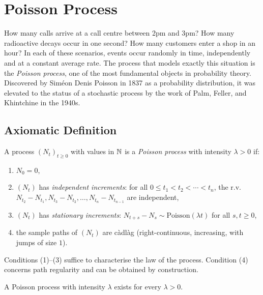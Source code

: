 \chapter{Poisson Process}
\label{ch:poisson}

How many calls arrive at a call centre between 2pm and 3pm? How many radioactive decays occur in one second? How many customers enter a shop in an hour? In each of these scenarios, events occur randomly in time, independently and at a constant average rate. The process that models exactly this situation is the \emph{Poisson process}, one of the most fundamental objects in probability theory. Discovered by Sim\'eon Denis Poisson in 1837 as a probability distribution, it was elevated to the status of a stochastic process by the work of Palm, Feller, and Khintchine in the 1940s.

\section{Axiomatic Definition}

\begin{definition}
\label{def:poisson}
A process $(N_t)_{t \geq 0}$ with values in $\mathbb{N}$ is a \emph{Poisson process}
with intensity $\lambda > 0$ if:
\begin{enumerate}
  \item $N_0 = 0$,
  \item $(N_t)$ has \emph{independent increments}: for all
    $0 \leq t_1 < t_2 < \cdots < t_n$, the r.v.\ $N_{t_2} - N_{t_1},
    N_{t_3} - N_{t_2}, \ldots, N_{t_n} - N_{t_{n-1}}$ are independent,
  \item $(N_t)$ has \emph{stationary increments}:
    $N_{t+s} - N_s \sim \text{Poisson}(\lambda t)$ for all $s, t \geq 0$,
  \item the sample paths of $(N_t)$ are c\`adl\`ag (right-continuous, increasing,
    with jumps of size $1$).
\end{enumerate}
\end{definition}

\begin{remark}
Conditions (1)--(3) suffice to characterise the law of the process.
Condition (4) concerns path regularity and can be obtained by construction.
\end{remark}

\begin{theorem}[Existence]
A Poisson process with intensity $\lambda$ exists for every $\lambda > 0$.
\end{theorem}

